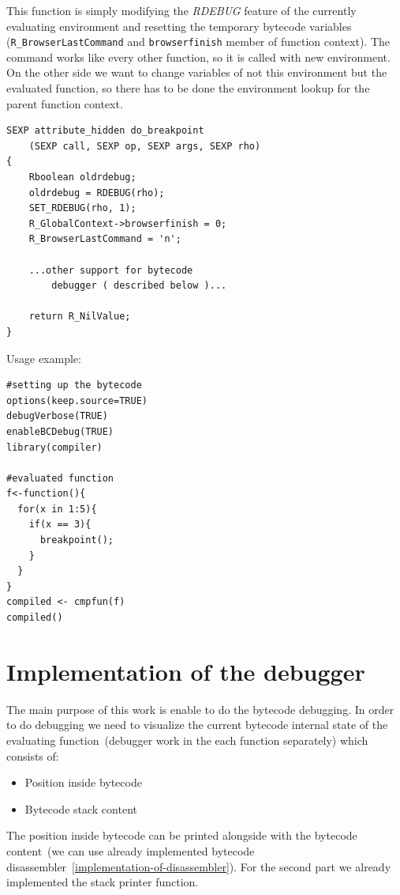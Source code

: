 \documentclass[thesis=M,english]{FITthesis}[2018/10/20]
\newcommand{\code}[1]{\texttt{#1}}
\begin{document}
This function is simply modifying the \textit{RDEBUG} feature of the currently evaluating environment and resetting the temporary bytecode variables (\code{R{\_}BrowserLastCommand} and \code{browserfinish} member of function context). The command works like every other function, so it is called with new environment. On the other side we want to change variables of not this environment but the evaluated function, so there has to be done the environment lookup for the parent function context.

\begin{lstlisting}
SEXP attribute_hidden do_breakpoint
	(SEXP call, SEXP op, SEXP args, SEXP rho)
{
    Rboolean oldrdebug;
    oldrdebug = RDEBUG(rho);
    SET_RDEBUG(rho, 1);
    R_GlobalContext->browserfinish = 0;
    R_BrowserLastCommand = 'n';

	...other support for bytecode 
		debugger ( described below )...

    return R_NilValue;
}
\end{lstlisting}

Usage example:
\begin{lstlisting}
#setting up the bytecode
options(keep.source=TRUE)
debugVerbose(TRUE)
enableBCDebug(TRUE)
library(compiler)

#evaluated function
f<-function(){
  for(x in 1:5){
    if(x == 3){
	  breakpoint();
	}
  }
}
compiled <- cmpfun(f)
compiled()
\end{lstlisting}


\section{Implementation of the debugger}\label{implementation-of-debugger}

The main purpose of this work is enable to do the bytecode debugging. In order to do debugging we need to visualize the current bytecode internal state of the evaluating function~(debugger work in the each function separately) which consists of:

\begin{itemize}
	\item Position inside bytecode
	\item Bytecode stack content
\end{itemize}

The position inside bytecode can be printed alongside with the bytecode content~(we can use already implemented bytecode disassembler~\ref{implementation-of-disassembler}). For the second part we already implemented the stack printer function.
\end{document}
